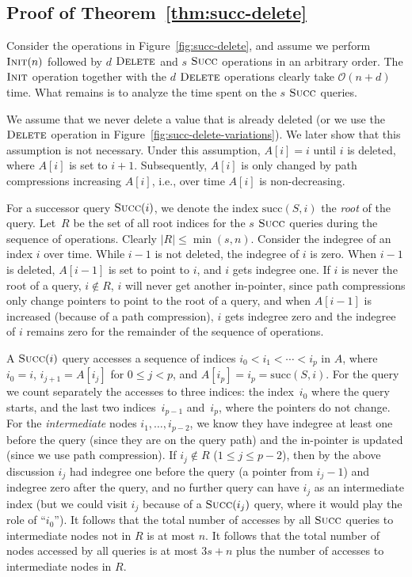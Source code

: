 \documentclass[a4paper]{lipics-v2021}
\newcommand{\Oh}{\mathcal{O}}
\newcommand{\successor}{\mathrm{succ}}
\newcommand{\FuncName}[1]{\textup{\textsc{#1}}}
\newcommand{\Init}{\FuncName{Init}}
\newcommand{\Delete}{\FuncName{Delete}}
\newcommand{\Succ}{\FuncName{Succ}}
\begin{document}
\subsection{Proof of Theorem~\ref{thm:succ-delete}}

Consider the operations in Figure~\ref{fig:succ-delete}, and assume we perform $\Init(n)$ followed by $d$ $\Delete$ and $s$ $\Succ$ operations in an arbitrary order. The $\Init$ operation together with the $d$ $\Delete$ operations clearly take $\Oh(n+d)$ time. What remains is to analyze the time spent on the $s$ $\Succ$ queries. 

We assume that we never delete a value that is already deleted (or we use the $\Delete$ operation in Figure~\ref{fig:succ-delete-variations}). We later show that this assumption is not necessary. Under this assumption, $A[i]=i$ until $i$ is deleted, where $A[i]$ is set to $i+1$. Subsequently, $A[i]$ is only changed by path compressions increasing $A[i]$, i.e., over time $A[i]$ is non-decreasing.

For a successor query $\Succ(i)$, we denote the index $\successor(S, i)$ the \emph{root} of the query. Let~$R$ be the set of all root indices for the $s$ $\Succ$ queries during the sequence of operations. Clearly $|R| \leq \min(s,n)$. Consider the indegree of an index $i$ over time. While $i-1$ is not deleted, the indegree of $i$ is zero. When $i-1$ is deleted, $A[i-1]$ is set to point to $i$, and $i$ gets indegree one. If $i$ is never the root of a query, $i\notin R$, $i$ will never get another in-pointer, since path compressions only change pointers to point to the root of a query, and when $A[i-1]$ is increased (because of a path compression), $i$ gets indegree zero and the indegree of $i$ remains zero for the remainder of the sequence of operations.

A $\Succ(i)$ query accesses a sequence of indices $i_0<i_1<\cdots<i_p$ in $A$, where $i_0=i$, $i_{j+1}=A[i_j]$ for $0 \leq j < p$, and $A[i_p]=i_p=\successor(S, i)$. For the query we count separately the accesses to three indices: the index~$i_0$ where the query starts, and the last two indices~$i_{p-1}$ and~$i_p$, where the pointers do not change. For the \emph{intermediate} nodes $i_1,\ldots,i_{p-2}$, we know they have indegree at least one before the query (since they are on the query path) and the in-pointer is updated (since we use path compression). If $i_j \notin R$ ($1\leq j \leq p-2$), then by the above discussion $i_j$ had indegree one before the query (a pointer from $i_j-1$) and indegree zero after the query, and no further query can have $i_j$ as an intermediate index (but we could visit $i_j$ because of a $\Succ(i_j)$ query, where it would play the role of ``$i_0$''). It follows that the total number of accesses by all $\Succ$ queries to intermediate nodes not in $R$ is at most $n$. It follows that the total number of nodes accessed by all queries is at most $3s+n$ plus the number of accesses to intermediate nodes in $R$.
\end{document}
